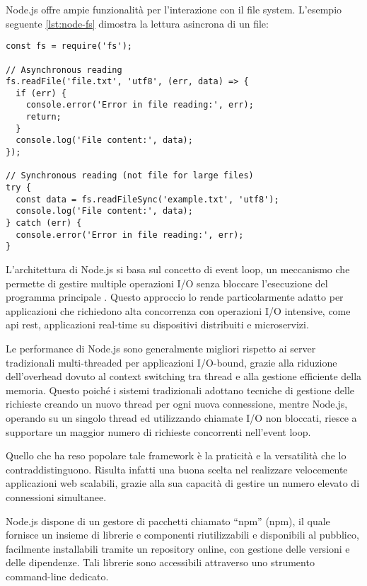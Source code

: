 Node.js offre ampie funzionalità per l'interazione con il file system.
L'esempio seguente \ref{lst:node-fs} dimostra la lettura asincrona di un file:

\begin{lstlisting}[caption={Lettura asincrona di file}, label=lst:node-fs]
const fs = require('fs');

// Asynchronous reading
fs.readFile('file.txt', 'utf8', (err, data) => {
  if (err) {
    console.error('Error in file reading:', err);
    return;
  }
  console.log('File content:', data);
});

// Synchronous reading (not file for large files)
try {
  const data = fs.readFileSync('example.txt', 'utf8');
  console.log('File content:', data);
} catch (err) {
  console.error('Error in file reading:', err);
}
\end{lstlisting}

L'architettura di Node.js si basa sul concetto di event loop, un meccanismo che permette di gestire multiple operazioni
I/O senza bloccare l'esecuzione del programma principale \citep{nodejs_docs_2023}. Questo approccio lo rende
particolarmente adatto per applicazioni che richiedono alta concorrenza con operazioni I/O intensive,
come \acrshort{api} \acrshort{rest}, applicazioni real-time su dispositivi distribuiti e microservizi.

Le performance di Node.js sono generalmente migliori rispetto ai server tradizionali multi-threaded per applicazioni
I/O-bound, grazie alla riduzione dell'overhead dovuto al context switching tra thread e alla gestione efficiente della
memoria. Questo poiché i sistemi tradizionali adottano tecniche di gestione delle richieste creando un nuovo thread
per ogni nuova connessione, mentre Node.js, operando su un singolo thread ed utilizzando chiamate I/O non bloccati,
riesce a supportare un maggior numero di richieste concorrenti nell'event loop.

Quello che ha reso popolare tale framework è la praticità e la versatilità che lo contraddistinguono.
Risulta infatti una buona scelta nel realizzare velocemente applicazioni web scalabili, grazie alla sua capacità
di gestire un numero elevato di connessioni simultanee.

Node.js dispone di un gestore di pacchetti chiamato ``\acrshort{npm}'' (\acrlong{npm}), il quale fornisce un insieme
di librerie e componenti riutilizzabili e disponibili al pubblico, facilmente installabili tramite un repository online,
con gestione delle versioni e delle dipendenze. Tali librerie sono accessibili attraverso uno strumento
command-line dedicato.

